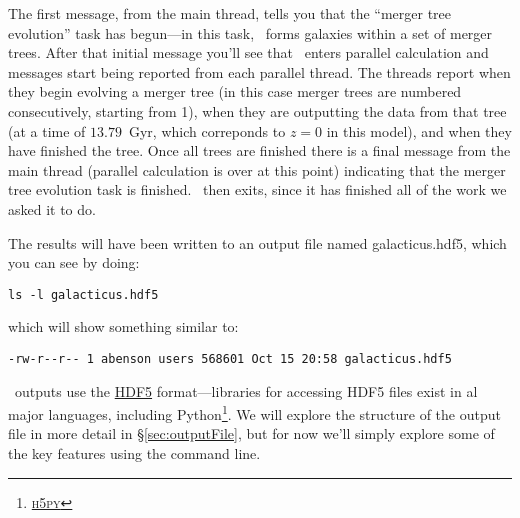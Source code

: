 The first message, from the main thread, tells you that the ``merger tree evolution'' task has begun---in this task, \glc\ forms galaxies within a set of merger trees. After that initial message you'll see that \glc\ enters parallel calculation and messages start being reported from each parallel thread. The threads report when they begin evolving a merger tree (in this case merger trees are numbered consecutively, starting from 1), when they are outputting the data from that tree (at a time of $13.79$~Gyr, which correponds to $z=0$ in this model), and when they have finished the tree. Once all trees are finished there is a final message from the main thread (parallel calculation is over at this point) indicating that the merger tree evolution task is finished. \glc\ then exits, since it has finished all of the work we asked it to do.

The results will have been written to an output file named {\normalfont \ttfamily galacticus.hdf5}, which you can see by doing:
\begin{verbatim}
ls -l galacticus.hdf5
\end{verbatim}
which will show something similar to:
\begin{verbatim}
-rw-r--r-- 1 abenson users 568601 Oct 15 20:58 galacticus.hdf5
\end{verbatim}
\glc\ outputs use the \href{http://www.hdfgroup.org/HDF5/}{HDF5} format---libraries for accessing HDF5 files exist in al major languages, including Python\footnote{\href{https://www.h5py.org/}{{\normalfont \scshape h5py}}}. We will explore the structure of the output file in more detail in \S\ref{sec:outputFile}, but for now we'll simply explore some of the key features using the command line.

